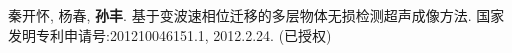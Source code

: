 \begin{resume}
\begin{publications}
  \end{publications}



  \begin{achievements}
    \item 秦开怀, 杨春, {\bf 孙丰}. 基于变波速相位迁移的多层物体无损检测超声成像方法. 国家发明专利申请号:201210046151.1, 2012.2.24. (已授权)
  \end{achievements}

\end{resume}
